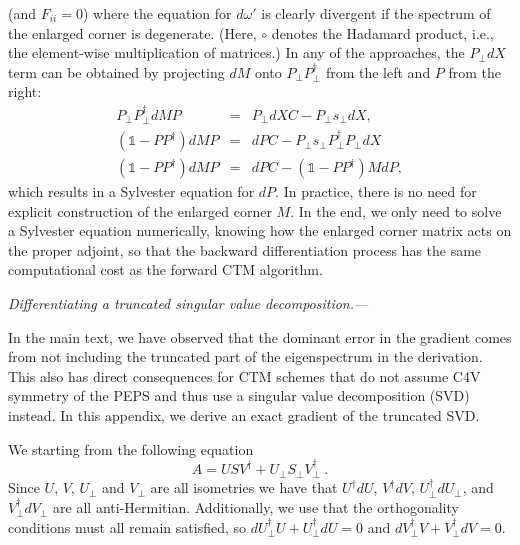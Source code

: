 \documentclass[twocolumn,floatfix,superscriptaddress,longbibliography,pra]{revtex4-2}
\renewcommand{\section}[1]{\emph{#1.---}}
\begin{document}
(and $F_{ii}=0$) 
where the equation for $d\omega'$ is clearly divergent if the spectrum of the enlarged corner is degenerate. 
(Here, $\circ$ denotes the Hadamard product, i.e., the element-wise multiplication of matrices.)
In any of the approaches, the $P_\perp dX$ term can be obtained by projecting $dM$ onto $P_\perp P_\perp^\dagger$ from the left and $P$ from the right:
\begin{eqnarray}
    P_\perp P_\perp^\dagger dM P &=& P_\perp dX C - P_\perp s_\perp dX, \nonumber \\
    (\mathbb{1} - PP^\dagger) dM P &=& dP C - P_\perp s_\perp P_\perp^\dagger P_\perp dX \nonumber\\
     (\mathbb{1} - PP^\dagger) dM P &=&dP C - (\mathbb{1} - PP^\dagger)M dP,
     \label{eq:app_dP}
\end{eqnarray}
which results in a Sylvester equation for $dP$. In practice, there is no need for explicit construction of the enlarged corner $M$. In the end, we only need to solve a Sylvester equation numerically, knowing how the enlarged corner matrix acts on the proper adjoint, so that the backward differentiation process has the same computational cost as the forward CTM algorithm.


\section{Differentiating a truncated singular value decomposition}
\label{appendix:differentiate-svd}

In the main text, we have observed that the dominant error in the gradient comes from not including the truncated part of the eigenspectrum in the derivation. This also has direct consequences for CTM schemes that do not assume C4V symmetry of the PEPS and thus use a singular value decomposition (SVD) instead.  In this appendix, we derive an exact gradient of the truncated SVD. 

We starting from the following equation
\begin{equation}
    A=USV^\dagger + U_\perp S_\perp V^\dagger_\perp\ .
\end{equation}
Since $U$, $V$, $U_\perp$ and $V_\perp$ are all isometries we have that $U^\dagger dU$, $V^\dagger dV$, $U_\perp^\dagger dU_\perp$, and $V_\perp^\dagger dV_\perp$ are all anti-Hermitian. Additionally, we use that the orthogonality conditions must all remain satisfied, so $dU_\perp^\dagger U + U_\perp^\dagger dU=0$ and $dV_\perp^\dagger V + V_\perp^\dagger dV=0$.
\end{document}
